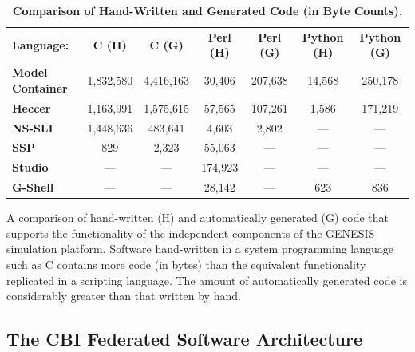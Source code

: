 \documentclass[10pt]{article}
\begin{document}
\begin{table}[ht]
  \caption{
    \bf{Comparison of Hand-Written and Generated Code (in Byte Counts).}}
  \begin{tabular}{l c c c c c c}

    {\bf Language:}
    & {\bf C (H)}
    & {\bf C (G)}
    & {\bf Perl (H)}
    & {\bf Perl (G)}
    & {\bf Python (H)}
    & {\bf Python (G)} \\

    {\bf Model Container}
    & 1,832,580
    & 4,416,163
    & 30,406
    & 207,638
    & 14,568
    & 250,178 \\

    {\bf Heccer}
    & 1,163,991
    & 1,575,615
    & 57,565
    & 107,261
    & 1,586
    & 171,219 \\

    {\bf NS-SLI}
    & 1,448,636
    & 483,641
    & 4,603
    & 2,802
    & ---
    & --- \\

    {\bf SSP}
    & 829
    & 2,323
    & 55,063
    & ---
    & ---
    & --- \\

    {\bf Studio}
    & ---
    & ---
    & 174,923
    & ---
    & ---
    & --- \\

    {\bf G-Shell}
    & ---
    & ---
    & 28,142
    & ---
    & 623
    & 836 \\
  \end{tabular}
  \begin{flushleft} A comparison of hand-written (H) and automatically generated (G) code that supports the functionality of the independent components of the GENESIS simulation platform. Software hand-written in a system programming language such as C contains more code (in bytes) than the equivalent functionality replicated in a scripting language. The amount of automatically generated code is considerably greater than that written by hand.
  \end{flushleft}
  \label{tab:cbi-codecounts}
\end{table}


\subsection*{The CBI Federated Software Architecture}
\label{subsec:cbi}
\end{document}
